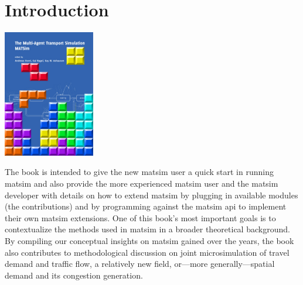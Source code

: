 \chapter*{Introduction}

\begin{center} \includegraphics[width=0.3\textwidth, angle=0]{frontmatter/figures/MATSimBook} \end{center}

%
%
The book is intended to give the new \gls{matsim} user a quick start in running \gls{matsim} and also provide the more experienced \gls{matsim} user and the \gls{matsim} developer with details on how to extend \gls{matsim} by plugging in available modules (\ie the \glspl{contribution}) and by programming against the \gls{matsim} \gls{api} to implement their own \gls{matsim} \glspl{extension}. One of this book's most important goals is to contextualize the methods used in \gls{matsim} in a broader theoretical background. By compiling our conceptual insights on \gls{matsim} gained over the years, the book also contributes to methodological discussion on joint \gls{microsimulation} of travel demand and traffic flow, a relatively new field, or---more generally---spatial demand and its congestion generation.

